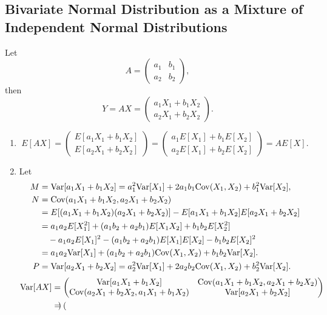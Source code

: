 \documentclass[11pt,a4paper]{article}
\begin{document}
\subsection{Bivariate Normal Distribution as a Mixture of Independent Normal Distributions}

Let $$A=\begin{pmatrix}a_1 & b_1 \\a_2 & b_2\end{pmatrix},$$
then $$Y=AX=\begin{pmatrix}
a_1X_1 + b_1X_2 \\
a_2X_1 + b_2X_2
\end{pmatrix}.$$

\begin{enumerate}[label=\roman*)]
\item
$$E[AX]=\begin{pmatrix}
E[a_1X_1 + b_1X_2]\\
E[a_2X_1 + b_2X_2]
\end{pmatrix}=\begin{pmatrix}
a_1E[X_1] + b_1E[X_2]\\
a_2E[X_1] + b_2E[X_2]
\end{pmatrix}=AE[X].$$
\item
Let
\begin{align*}
M&={\rm Var}[a_1X_1 + b_1X_2]=a_1^2{\rm Var}[X_1]+2a_1b_1{\rm Cov}(X_1,X_2)+b_1^2{\rm Var}[X_2],\\
N&={\rm Cov}(a_1X_1 + b_1X_2,a_2X_1 + b_2X_2)\\
&=E[(a_1X_1 + b_1X_2)(a_2X_1 + b_2X_2)]-E[a_1X_1 + b_1X_2]E[a_2X_1 + b_2X_2]\\
&=a_1a_2E[X_1^2]+(a_1b_2+a_2b_1)E[X_1X_2]+b_1b_2E[X_2^2]\\
&\quad-a_1a_2E[X_1]^2-(a_1b_2+a_2b_1)E[X_1]E[X_2]-b_1b_2E[X_2]^2\\
&=a_1a_2{\rm Var}[X_1]+(a_1b_2+a_2b_1){\rm Cov}(X_1,X_2)+b_1b_2{\rm Var}[X_2].\\
P&={\rm Var}[a_2X_1 + b_2X_2]=a_2^2{\rm Var}[X_1]+2a_2b_2{\rm Cov}(X_1,X_2)+b_2^2{\rm Var}[X_2].
\end{align*}
\begin{align*}
{\rm Var}[AX]&=\begin{pmatrix}
{\rm Var}[a_1X_1 + b_1X_2] & {\rm Cov}(a_1X_1 + b_1X_2,a_2X_1 + b_2X_2)\\
{\rm Cov}(a_2X_1 + b_2X_2,a_1X_1 + b_1X_2) & {\rm Var}[a_2X_1 + b_2X_2]
\end{pmatrix}\\
&=\begin{pmatrix}

\end{pmatrix}
\end{align*}
\end{enumerate}
\end{document}
